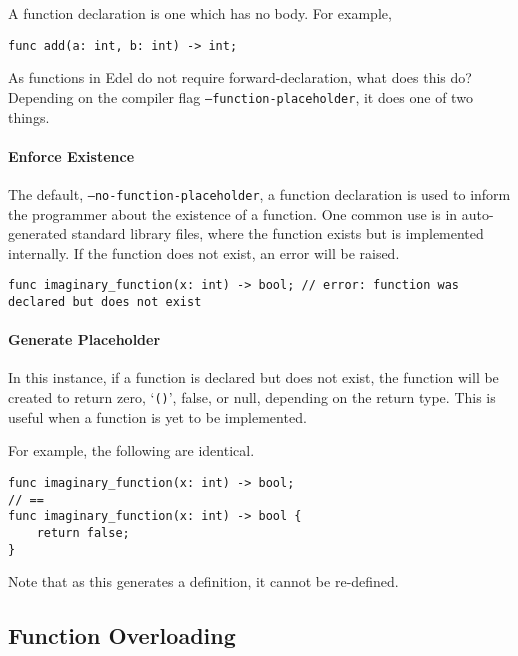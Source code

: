 \documentclass{article}
\begin{document}
    A function declaration is one which has no body.
    For example,

    \begin{lstlisting}[language=CustomLang]
func add(a: int, b: int) -> int;
    \end{lstlisting}

    As functions in Edel do not require forward-declaration, what does this do?
    Depending on the compiler flag \texttt{--function-placeholder}, it does one of two things.

    \paragraph*{Enforce Existence}

    The default, \texttt{--no-function-placeholder}, a function declaration is used to inform the programmer about the existence of a function.
    One common use is in auto-generated standard library files, where the function exists but is implemented internally.
    If the function does not exist, an error will be raised.

    \begin{lstlisting}[language=CustomLang]
func imaginary_function(x: int) -> bool; // error: function was declared but does not exist
    \end{lstlisting}

    \paragraph*{Generate Placeholder}

    In this instance, if a function is declared but does not exist, the function will be created to return zero, `\texttt{()}', false, or null, depending on the return type.
    This is useful when a function is yet to be implemented.

    For example, the following are identical.
    \begin{lstlisting}[language=CustomLang]
func imaginary_function(x: int) -> bool;
// ==
func imaginary_function(x: int) -> bool {
    return false;
}
    \end{lstlisting}


    Note that as this generates a definition, it cannot be re-defined.

    \subsection{Function Overloading}\label{subsec:function-overloading}
\end{document}
